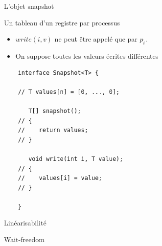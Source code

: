 
\begingroup

\begin{frame}[fragile]{L'objet snapshot}

  \begin{description}
  \item[Spécification séquentielle :] Un tableau d'un registre par processus
  \end{description}
  \begin{itemize}
  \item $write(i,v)$ ne peut être appelé que par $p_i$.
  \item On suppose toutes les valeurs écrites différentes
  \end{itemize}
  
  \begin{lstlisting}
    interface Snapshot<T> {
      
    // T values[n] = [0, ..., 0];
      
       T[] snapshot();
    // {
    //    return values;
    // }
    
       void write(int i, T value);
    // {
    //    values[i] = value;
    // }

    }
  \end{lstlisting}

  \begin{description}
  \item[Critère de cohérence :] Linéarisabilité
  \item[Condition de progression :] Wait-freedom
  \end{description}


\end{frame}

\endgroup
\endinput
